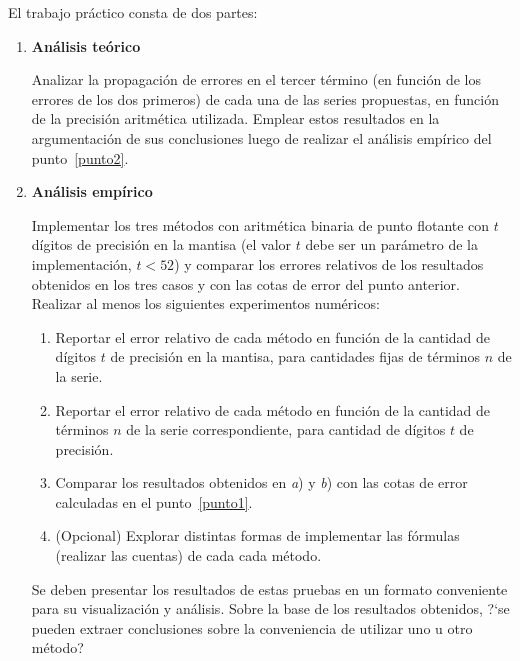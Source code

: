 El trabajo pr\'actico consta de dos partes:
\vspace{-12pt}
\begin{enumerate}
 \item {\bf An\'alisis te\'orico} \label{punto1}


    Analizar la propagaci\'on de errores en el tercer t\'ermino (en funci\'on de los errores de los dos primeros) de cada una de las series propuestas, en funci\'on de la precisi\'on aritm\'etica utilizada. Emplear estos resultados en la argumentaci\'on de sus conclusiones luego de realizar el an\'alisis emp\'irico del punto~\ref{punto2}.

 \item {\bf An\'alisis emp\'irico} \label{punto2}

    Implementar los tres m\'etodos con aritm\'etica binaria de punto flotante con $t$ d\'igitos de precisi\'on en la mantisa (el valor $t$ debe ser un par\'ametro de la implementaci\'on, $t < 52$) y comparar los errores relativos de los resultados obtenidos en los tres casos y con las cotas de error del punto anterior. Realizar al menos los siguientes experimentos num\'ericos:
    \begin{enumerate}
    \item Reportar el error relativo de cada m\'etodo en funci\'on de la cantidad de d\'igitos $t$ de precisi\'on en la mantisa, para cantidades fijas de t\'erminos $n$ de la serie.
    \item Reportar el error relativo de cada m\'etodo en funci\'on de la cantidad de t\'erminos $n$ de la serie correspondiente, para cantidad de d\'igitos $t$ de precisi\'on.
    \item Comparar los resultados obtenidos en \textit{a}) y \textit{b}) con las cotas de error calculadas en el punto~\ref{punto1}.
    \item (Opcional) Explorar distintas formas de implementar las f\'ormulas (realizar las cuentas) de cada cada m\'etodo.
    \end{enumerate}

    Se deben presentar los resultados de estas pruebas en un formato conveniente para su visualizaci\'on y an\'alisis.
    Sobre la base de los resultados obtenidos, ?`se pueden extraer conclusiones sobre la conveniencia de utilizar uno u otro m\'etodo?
\end{enumerate}

